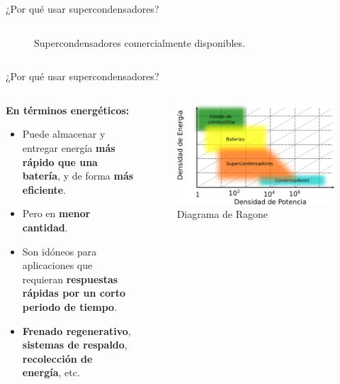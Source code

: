 \documentclass[aspectratio=169]{beamer}
\begin{document}
\begin{frame}{¿Por qué usar supercondensadores?}
\begin{columns}
\begin{column}{0.5\textwidth}
\begin{onlyenv}
\begin{figure}[b]
\begin{tikzpicture}
						\end{tikzpicture}
						\caption{Supercondensadores comercialmente disponibles.}
					\end{figure}
				\end{onlyenv}

			\end{column}
		\end{columns}
	\end{frame}

	\begin{frame}{¿Por qué usar supercondensadores?}
		\begin{columns}
			\begin{column}{0.5\textwidth}
				\only<1->\textbf{En términos energéticos:}
				\begin{itemize}[<+(1)->]
					\item Puede almacenar y entregar energía \textbf{más rápido que una batería}, y de forma \textbf{más eficiente}.
					\item Pero en \textbf{menor cantidad}.
					\item Son idóneos para aplicaciones que requieran \textbf{respuestas rápidas por un corto periodo de tiempo}.
					\item \textbf{Frenado regenerativo}, \textbf{sistemas de respaldo}, \textbf{recolección de energía}, etc.
				\end{itemize}
			\end{column}
			\begin{column}{0.5\textwidth}
				\begin{figure}[b]
					\includegraphics[width = \textwidth]{ragone.pdf}
					\caption{Diagrama de Ragone}
				\end{figure}
			\end{column}
		\end{columns}
	\end{frame}
\end{document}
